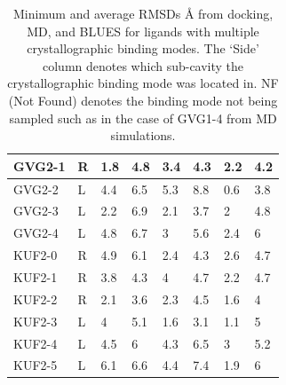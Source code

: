 \begin{table}[]
\begin{tabular}{|l|l|l|l|l|l|l|l|}
GVG2-1          & R             & 1.8              & 4.8              & 3.4            & 4.3            & 2.2               & 4.2               \\ \hline
GVG2-2          & L             & 4.4              & 6.5              & 5.3            & 8.8            & 0.6               & 3.8               \\ \hline
GVG2-3          & L             & 2.2              & 6.9              & 2.1            & 3.7            & 2                 & 4.8               \\ \hline
GVG2-4          & L             & 4.8              & 6.7              & 3              & 5.6            & 2.4               & 6                 \\ \hline
KUF2-0          & R             & 4.9              & 6.1              & 2.4            & 4.3            & 2.6               & 4.7               \\ \hline
KUF2-1          & R             & 3.8              & 4.3              & 4              & 4.7            & 2.2               & 4.7               \\ \hline
KUF2-2          & R             & 2.1              & 3.6              & 2.3            & 4.5            & 1.6               & 4                 \\ \hline
KUF2-3          & L             & 4                & 5.1              & 1.6            & 3.1            & 1.1               & 5                 \\ \hline
KUF2-4          & L             & 4.5              & 6                & 4.3            & 6.5            & 3                 & 5.2               \\ \hline
KUF2-5          & L             & 6.1              & 6.6              & 4.4            & 7.4            & 1.9               & 6                 \\ \hline
\end{tabular}
\caption[Multiple Binding Mode RMSDs]{Minimum and average RMSDs {\AA} from docking, MD, and BLUES for ligands with multiple crystallographic binding modes. The `Side' column denotes which sub-cavity the crystallographic binding mode was located in. NF (Not Found) denotes the binding mode not being sampled such as in the case of GVG1-4 from MD simulations.}
\label{table:multibm}
\end{table}


